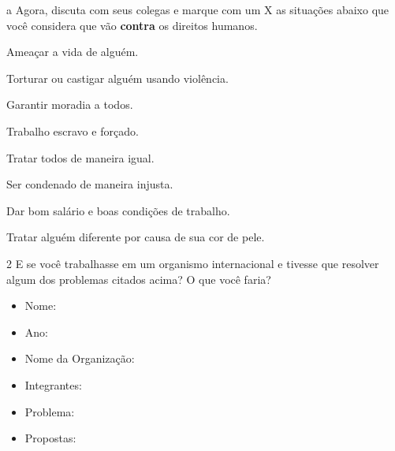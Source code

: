 \num{a} Agora, discuta com seus colegas e marque com um X as situações abaixo
que você considera que vão \textbf{contra} os direitos humanos.

\begin{boxlist}
\item Ameaçar a vida de alguém.

\item Torturar ou castigar alguém usando violência.

\item Garantir moradia a todos.

\item Trabalho escravo e forçado.

\item Tratar todos de maneira igual.

\item Ser condenado de maneira injusta.

\item Dar bom salário e boas condições de trabalho.

\item Tratar alguém diferente por causa de sua cor de pele.
\end{boxlist}

\num{2} E se você trabalhasse em um organismo internacional e tivesse que
resolver algum dos problemas citados acima? O que você faria?


\begin{itemize}
\item Nome: 

\item Ano: 

\item Nome da Organização: 

\item Integrantes: 

\item Problema: 

\item Propostas: 
\end{itemize}

